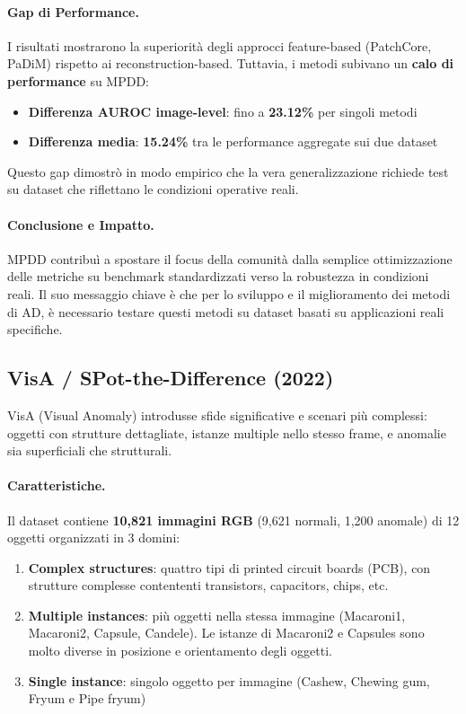 \paragraph{Gap di Performance.} 
I risultati mostrarono la superiorità degli approcci feature-based (PatchCore, PaDiM) rispetto ai reconstruction-based. Tuttavia, i metodi subivano un \textbf{calo di per\-for\-mance} su MPDD:
\begin{itemize}
    \item \textbf{Differenza AUROC image-level}: fino a \textbf{23.12\%} per singoli metodi
    \item \textbf{Differenza media}: \textbf{15.24\%} tra le performance aggregate sui due dataset
\end{itemize}

Questo gap dimostrò in modo empirico che la vera generalizzazione richiede test su dataset che riflettano le condizioni operative reali.

\paragraph{Conclusione e Impatto.} 
MPDD contribuì a spostare il focus della comunità dalla semplice ottimizzazione delle metriche su benchmark standardizzati verso la robustezza in condizioni reali. Il suo messaggio chiave è che per lo sviluppo e il miglioramento dei metodi di AD, è necessario testare questi metodi su dataset basati su applicazioni reali specifiche.


\subsection{VisA / SPot-the-Difference (2022)}
\label{sec:visa}
VisA (Visual Anomaly) \cite{zou2022spot} introdusse sfide significative e scenari più complessi: oggetti con strutture dettagliate, istanze multiple nello stesso frame, e anomalie sia superficiali che strutturali.

\paragraph{Caratteristiche.} Il dataset contiene \textbf{10,821 immagini RGB} (9,621 normali, 1,200 anomale) di 12 oggetti organizzati in 3 domini:
\begin{enumerate}
\item \textbf{Complex structures}: quattro tipi di printed circuit boards (PCB), con strutture complesse contententi transistors, capacitors, chips,
etc. 
\item \textbf{Multiple instances}: più oggetti nella stessa immagine (Macaroni1, Macaroni2, Capsule, Candele). Le istanze di Macaroni2 e Capsules sono molto diverse in posizione e orientamento degli oggetti.
\item \textbf{Single instance}: singolo oggetto per immagine (Cashew, Chewing gum, Fryum e Pipe fryum)
\end{enumerate}

